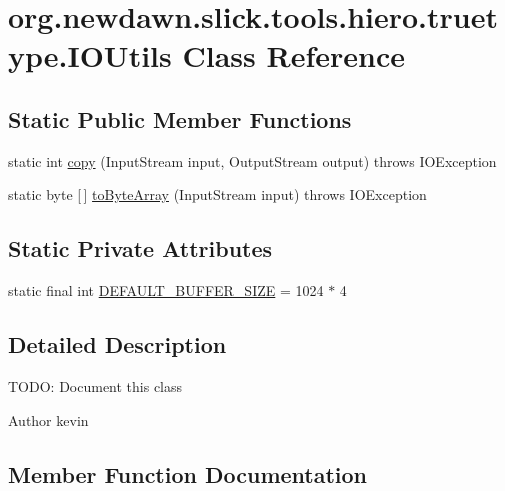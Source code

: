 \hypertarget{classorg_1_1newdawn_1_1slick_1_1tools_1_1hiero_1_1truetype_1_1_i_o_utils}{}\section{org.\+newdawn.\+slick.\+tools.\+hiero.\+truetype.\+I\+O\+Utils Class Reference}
\label{classorg_1_1newdawn_1_1slick_1_1tools_1_1hiero_1_1truetype_1_1_i_o_utils}
\subsection*{Static Public Member Functions}
\begin{DoxyCompactItemize}
\item 
static int \mbox{\hyperlink{classorg_1_1newdawn_1_1slick_1_1tools_1_1hiero_1_1truetype_1_1_i_o_utils_a8d18ffd2be08d137d80f3f1949ea67e3}{copy}} (Input\+Stream input, Output\+Stream output)  throws I\+O\+Exception 
\item 
static byte \mbox{[}$\,$\mbox{]} \mbox{\hyperlink{classorg_1_1newdawn_1_1slick_1_1tools_1_1hiero_1_1truetype_1_1_i_o_utils_a4495b47b8758850ade00d36fd0ae06c0}{to\+Byte\+Array}} (Input\+Stream input)  throws I\+O\+Exception 
\end{DoxyCompactItemize}
\subsection*{Static Private Attributes}
\begin{DoxyCompactItemize}
\item 
static final int \mbox{\hyperlink{classorg_1_1newdawn_1_1slick_1_1tools_1_1hiero_1_1truetype_1_1_i_o_utils_a7d591bed6c62c8cbf595d86223ffe25f}{D\+E\+F\+A\+U\+L\+T\+\_\+\+B\+U\+F\+F\+E\+R\+\_\+\+S\+I\+ZE}} = 1024 $\ast$ 4
\end{DoxyCompactItemize}


\subsection{Detailed Description}
T\+O\+DO\+: Document this class

\begin{DoxyAuthor}{Author}
kevin 
\end{DoxyAuthor}


\subsection{Member Function Documentation}
\mbox{\label{classorg_1_1newdawn_1_1slick_1_1tools_1_1hiero_1_1truetype_1_1_i_o_utils_a8d18ffd2be08d137d80f3f1949ea67e3}} 
